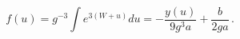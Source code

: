 \begin{equation}
f(u) = g^{-3}\int e^{3(W + u)} du = -\frac{y(u)}{9g^3 a} + \frac{b}{2g a}\,.
       \label{f}
\end{equation}

